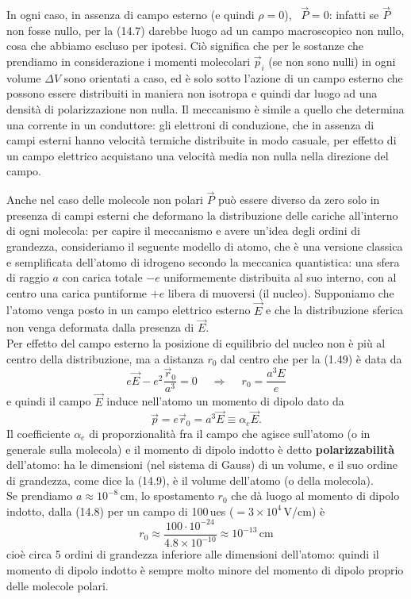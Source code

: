 In ogni caso, in assenza di campo esterno (e quindi $\rho=0$), \ $\vec P=0$:
infatti se $\vec P$ non fosse nullo, per la (14.7) darebbe luogo ad un campo
macroscopico non nullo, cosa che abbiamo escluso per ipotesi. Ci\`o significa
che per le sostanze che prendiamo in considerazione i momenti molecolari
$\vec p_i$ (se non sono nulli) in ogni volume $\Delta V$ sono orientati a caso,
ed \`e solo sotto l'azione di un campo esterno che possono essere distribuiti in
maniera non isotropa e quindi dar luogo ad una densit\`a di polarizzazione non
nulla. Il meccanismo \`e simile a quello che determina una corrente in un
conduttore: gli elettroni di conduzione, che in assenza di campi esterni hanno
velocit\`a termiche distribuite in modo casuale, per effetto di un campo
elettrico acquistano una velocit\`a media non nulla nella direzione del campo.

Anche nel caso delle molecole non polari $\vec P$ pu\`o essere diverso da zero
solo in presenza di campi esterni che deformano la distribuzione delle cariche
all'interno di ogni molecola: per capire il meccanismo e avere un'idea degli
ordini di grandezza, consideriamo il seguente modello di atomo, che \`e una
versione classica e semplificata dell'atomo di
idrogeno secondo la meccanica quantistica: una sfera di raggio $a$ con carica
totale $-e$ uniformemente distribuita al suo interno, con al centro una carica
puntiforme $+e$ libera di muoversi (il nucleo). Supponiamo che l'atomo venga
posto in un campo elettrico esterno $\vec E$ e che la distribuzione sferica non
venga deformata dalla presenza di $\vec E$.\\
Per effetto del campo esterno la posizione di equilibrio del nucleo non \`e
pi\`u al centro della distribuzione, ma a distanza $r_0$ dal centro che per la
(1.49) \`e data da
\begin{equation}
  e\vec E-e^2\frac{\vec r_0}{a^3}=0\quad\ \Rightarrow\quad\ r_0=\frac{a^3E}{e}
  \tag{14.8}
\end{equation}
e quindi il campo $\vec E$ induce nell'atomo un momento di dipolo dato da
\begin{equation}
  \vec p=e\vec r_0=a^3\vec E\equiv\alpha_e\vec E.
  \tag{14.9}
\end{equation}
Il coefficiente $\alpha_e$ di proporzionalit\`a fra il campo che agisce
sull'atomo (o in generale sulla molecola) e il momento di dipolo indotto \`e
detto \textbf{polarizzabilit\`a} dell'atomo: ha le dimensioni (nel sistema di
Gauss) di un volume, e il suo ordine di grandezza, come dice la (14.9), \`e il
volume dell'atomo (o della molecola).\\
Se prendiamo $a\approx10^{-8}$\,cm, lo spostamento $r_0$ che d\`a luogo al
momento di dipolo indotto, dalla (14.8) per un campo di 100\,ues
($=3\times10^4$\,V/cm) \`e
\begin{equation}
  r_0\approx\frac{100\cdot10^{-24}}{4.8\times10^{-10}}
  \approx10^{-13}\,\mathrm{cm}
  \tag{14.10}
\end{equation}
cio\`e circa 5 ordini di grandezza inferiore alle dimensioni dell'atomo: quindi
il momento di dipolo indotto \`e sempre molto minore del momento di dipolo
proprio delle molecole polari.

